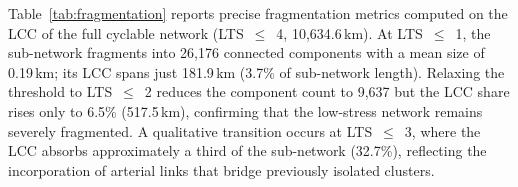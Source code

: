 \begin{table}[h]
    \centering
    \caption{Network fragmentation metrics by LTS threshold, computed on the largest connected component of the full cyclable network (LTS~$\leq$~4, 10,634.6~km).}
    \label{tab:fragmentation}
\end{table}

Table~\ref{tab:fragmentation} reports precise fragmentation metrics
computed on the LCC of the full cyclable network (LTS~$\leq$~4,
10,634.6\,km). At LTS~$\leq$~1, the sub-network fragments into
26,176 connected components with a mean size of 0.19\,km; its LCC
spans just 181.9\,km (3.7\% of sub-network length). Relaxing the
threshold to LTS~$\leq$~2 reduces the component count to 9,637 but
the LCC share rises only to 6.5\% (517.5\,km), confirming that the
low-stress network remains severely fragmented. A qualitative
transition occurs at LTS~$\leq$~3, where the LCC absorbs
approximately a third of the sub-network (32.7\%), reflecting the
incorporation of arterial links that bridge previously isolated
clusters.

